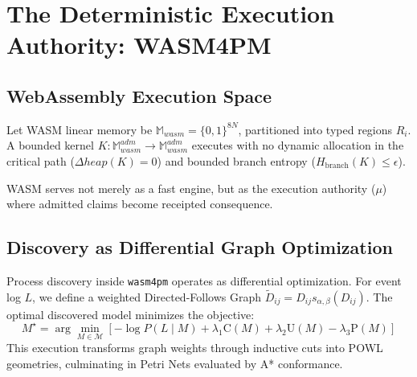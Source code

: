 
\chapter{The Deterministic Execution Authority: WASM4PM}
\section{WebAssembly Execution Space}
Let WASM linear memory be $\mathbb{M}_{wasm} = \{0,1\}^{8N}$, partitioned into typed regions $R_i$. A bounded kernel $K: \mathbb{M}_{wasm}^{adm} \to \mathbb{M}_{wasm}^{adm}$ executes with no dynamic allocation in the critical path ($\Delta heap(K)=0$) and bounded branch entropy ($H_{\mathrm{branch}}(K) \le \epsilon$).

WASM serves not merely as a fast engine, but as the execution authority ($\mu$) where admitted claims become receipted consequence.

\section{Discovery as Differential Graph Optimization}
Process discovery inside \texttt{wasm4pm} operates as differential optimization. For event log $L$, we define a weighted Directed-Follows Graph $\widetilde{D}_{ij} = D_{ij} s_{\alpha,\beta}(D_{ij})$. The optimal discovered model minimizes the objective:
\begin{equation}
M^{\star} = \arg\min_{M \in \mathcal{M}} \left[ -\log P(L\mid M) + \lambda_1 \mathrm{C}(M) + \lambda_2 \mathrm{U}(M) - \lambda_3 \mathrm{P}(M) \right]
\end{equation}
This execution transforms graph weights through inductive cuts into POWL geometries, culminating in Petri Nets evaluated by A* conformance.
